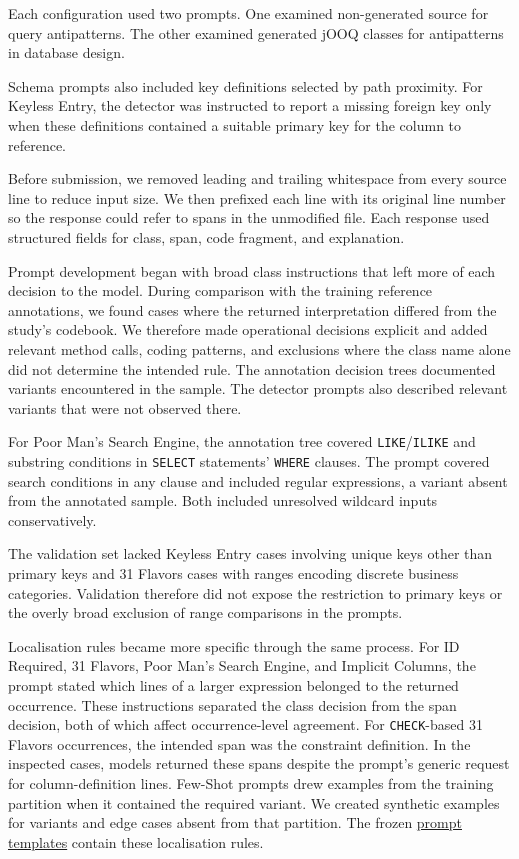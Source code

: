 Each configuration used two prompts. One examined non-generated source for query antipatterns. The other examined generated jOOQ classes for antipatterns in database design.

Schema prompts also included key definitions selected by path proximity. For Keyless Entry, the detector was instructed to report a missing foreign key only when these definitions contained a suitable primary key for the column to reference.

Before submission, we removed leading and trailing whitespace from every source line to reduce input size. We then prefixed each line with its original line number so the response could refer to spans in the unmodified file. Each response used structured fields for class, span, code fragment, and explanation.

Prompt development began with broad class instructions that left more of each decision to the model. During comparison with the training reference annotations, we found cases where the returned interpretation differed from the study's codebook. We therefore made operational decisions explicit and added relevant method calls, coding patterns, and exclusions where the class name alone did not determine the intended rule. The annotation decision trees documented variants encountered in the sample. The detector prompts also described relevant variants that were not observed there.

For Poor Man's Search Engine, the annotation tree covered \texttt{LIKE}/\texttt{ILIKE} and substring conditions in \texttt{SELECT} statements' \texttt{WHERE} clauses. The prompt covered search conditions in any clause and included regular expressions, a variant absent from the annotated sample. Both included unresolved wildcard inputs conservatively.

The validation set lacked Keyless Entry cases involving unique keys other than primary keys and 31 Flavors cases with ranges encoding discrete business categories. Validation therefore did not expose the restriction to primary keys or the overly broad exclusion of range comparisons in the prompts.

Localisation rules became more specific through the same process. For ID Required, 31 Flavors, Poor Man's Search Engine, and Implicit Columns, the prompt stated which lines of a larger expression belonged to the returned occurrence. These instructions separated the class decision from the span decision, both of which affect occurrence-level agreement. For \texttt{CHECK}-based 31 Flavors occurrences, the intended span was the constraint definition. In the inspected cases, models returned these spans despite the prompt's generic request for column-definition lines. Few-Shot prompts drew examples from the training partition when it contained the required variant. We created synthetic examples for variants and edge cases absent from that partition. The frozen \href{https://github.com/kristoisberg/masters-thesis/tree/9913a7670fce52b135651f95ff18cd505c61b142/prompts}{prompt templates} contain these localisation rules.\label{sec:prompts}

